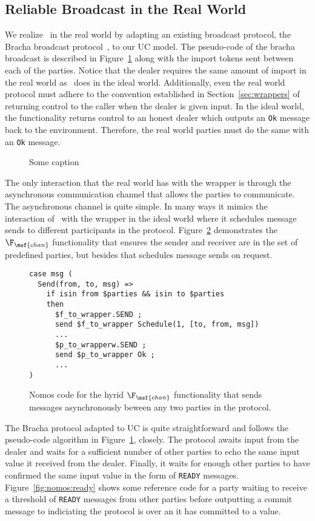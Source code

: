 \subsection{Reliable Broadcast in the Real World}
We realize \Frbc~in the real world by adapting an existing broadcast protocol, the Bracha broadcast protocol~\cite{bracha}, to our UC model. 
The pseudo-code of the bracha broadcast is described in Figure~\ref{fig:protbracha} along with the import tokens sent between each of the parties.
Notice that the dealer requires the same amount of import in the real world as \Frbc~does in the ideal world.
Additionally, even the real world protocol must adhere to the convention established in Section~\ref{sec:wrappers} of returning control to the caller when the dealer is given input.
In the ideal world, the functionality returns control to an honest dealer which outputs an \texttt{Ok} message back to the environment. 
Therefore, the real world parties must do the same with an \texttt{Ok} message.

\begin{figure}

\caption{Some caption}
\label{fig:protbracha}
\end{figure}

The only interaction that the real world has with the wrapper is through the asynchronous communication channel that allows the parties to communicate.
The asynchronous channel is quite simple. 
In many ways it mimics the interaction of \Frbc~with the wrapper in the ideal world where it schedules message sends to different participants in the protocol.
Figure~\ref{fig:nomos:fchan} demonstrates the $\F_{\msf{chan}}$ functionality that ensures the sender and receiver are in the set of predefined parties, but besides that schedules message sends on request.

\begin{figure}
\begin{lstlisting}[basicstyle=\small\ttfamily, frame=single]
case msg (
  Send(from, to, msg) =>
    if isin from $parties && isin to $parties
	then
	  $f_to_wrapper.SEND ;
	  send $f_to_wrapper Schedule(1, [to, from, msg])
	  ...
	  $p_to_wrapperw.SEND ;
	  send $p_to_wrapper Ok ;
      ...
)
\end{lstlisting}
\caption{Nomos code for the hyrid $\F_{\msf{chan}}$ functionality that sends messages asynchronously beween any two parties in the protocol.}
\label{fig:nomos:fchan}
\end{figure}

The Bracha protocol adapted to UC is quite straightforward and follows the pseudo-code algorithm in Figure~\ref{fig:protbracha}, closely.
The protocol awaits input from the dealer and waits for a sufficient number of other parties to echo the same input value it received from the dealer.
Finally, it waits for enough other parties to have confirmed the same input value in the form of \texttt{READY} messages. 
Figure~\ref{fig:nomos:ready} shows some reference code for a party waiting to receive a threshold of \texttt{READY} messages from other parties before outputting a commit message to \Environment indiciating the protocol is over an it has committed to a value.

